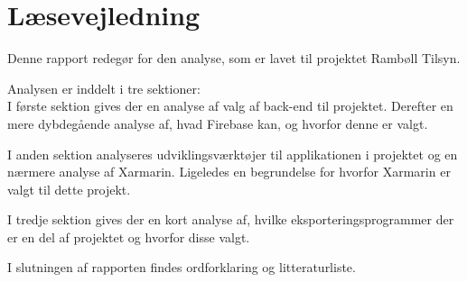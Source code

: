 \chapter*{Læsevejledning}
Denne rapport redegør for den analyse, som er lavet til projektet Rambøll Tilsyn. 

Analysen er inddelt i tre sektioner:\\
I første sektion gives der en analyse af valg af back-end til projektet. Derefter en mere dybdegående analyse af, hvad Firebase kan, og hvorfor denne er valgt.

I anden sektion analyseres udviklingsværktøjer til applikationen i projektet og en nærmere analyse af Xarmarin. Ligeledes en begrundelse for hvorfor Xarmarin er valgt til dette projekt.

I tredje sektion gives der en kort analyse af, hvilke eksporteringsprogrammer der er en del af projektet og hvorfor disse valgt.

I slutningen af rapporten findes ordforklaring og litteraturliste.
